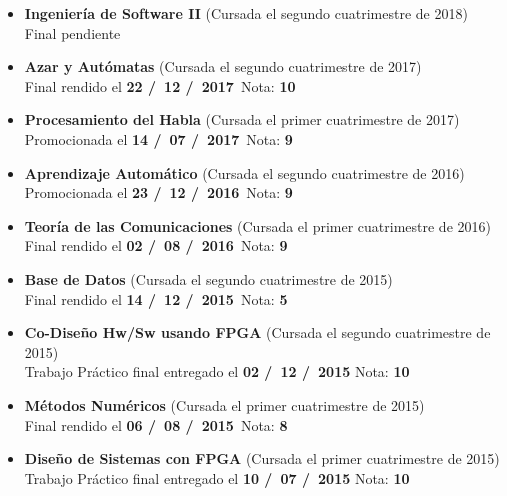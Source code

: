 \begin{itemize}[leftmargin=0.8cm]

  \item{\textbf{Ingeniería de Software II} (Cursada el segundo cuatrimestre de 2018)\\
  Final pendiente}

  \item{\textbf{Azar y Autómatas} (Cursada el segundo cuatrimestre de 2017)\\
  Final rendido el \textbf{22 \slash \ 12 \slash \ 2017}\  \hfill Nota: \textbf{10}}

  \item{\textbf{Procesamiento del Habla} (Cursada el primer cuatrimestre de 2017)\\
  Promocionada el \textbf{14 \slash \ 07 \slash \ 2017}\  \hfill Nota: \textbf{9}}

  \item{\textbf{Aprendizaje Automático} (Cursada el segundo cuatrimestre de 2016)\\
  Promocionada el \textbf{23 \slash \ 12 \slash \ 2016}\  \hfill Nota: \textbf{9}}

  \item{\textbf{Teoría de las Comunicaciones} (Cursada el primer cuatrimestre de 2016)\\
  Final rendido el \textbf{02 \slash \ 08 \slash \ 2016}\  \hfill Nota: \textbf{9}}

  \item{\textbf{Base de Datos} (Cursada el segundo cuatrimestre de 2015)\\
  Final rendido el \textbf{14 \slash \ 12 \slash \ 2015}\  \hfill Nota: \textbf{5}}

  \item{\textbf{Co-Diseño Hw/Sw usando FPGA} (Cursada el segundo cuatrimestre de 2015)\\
  Trabajo Práctico final entregado el \textbf{02 \slash \ 12 \slash \ 2015} \hfill Nota: \textbf{10}}

  \item{\textbf{Métodos Numéricos} (Cursada el primer cuatrimestre de 2015)\\
  Final rendido el \textbf{06 \slash \ 08 \slash \ 2015}\  \hfill Nota: \textbf{8}}

  \item{\textbf{Diseño de Sistemas con FPGA} (Cursada el primer cuatrimestre de 2015)\\
  Trabajo Práctico final entregado el \textbf{10 \slash \ 07 \slash \ 2015} \hfill Nota: \textbf{10}}


\end{itemize}
